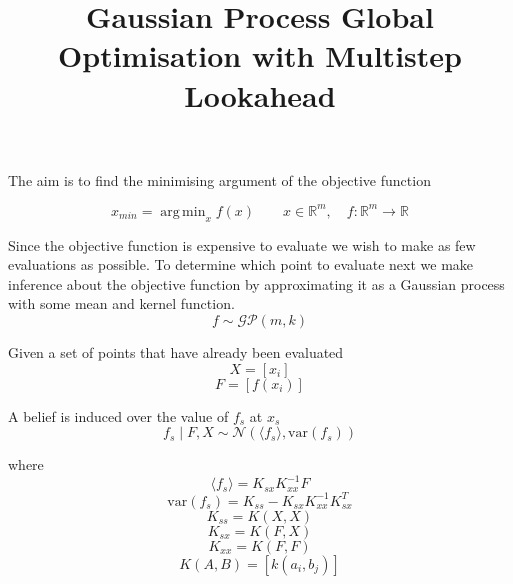 \documentclass[11pt]{article}
\title{\textbf{Gaussian Process Global Optimisation with Multistep Lookahead
}}
\author{}
\date{}
\DeclareMathOperator*{\argmin}{arg\,min}
\begin{document}
\maketitle



\section{}

The aim is to find the minimising argument of the objective function

\begin{equation}
x_{min}=\argmin_{x}f(x)\qquad\mathbf{\mathit{x}}\in\mathbb{R^{\mathit{m}}},\quad f:\mathbb{R^{\mathit{m}}}\rightarrow\mathbb{R}
\end{equation}

Since the objective function is expensive to evaluate we wish to make as few evaluations as possible. To determine which point to evaluate next we make inference about the objective function by approximating it as a Gaussian process with some mean and kernel function.
\begin{equation}
f \sim \mathcal{GP}(m,k)
\end{equation}

Given a set of points that have already been evaluated
\begin{equation}
X	=\left[x_{i}\right]
\end{equation}
\begin{equation}
F	=\left[f\left(x_{i}\right)\right]
\end{equation}

A belief is induced over the value of $f_{s}$ at $x_{s}$
\begin{equation}
 f_{s}\mid F,X\sim\mathcal{N}\left( \langle f_{s}\rangle ,\mathrm{var}(f_{s})\right)
\end{equation} 

where
\begin{equation}
\langle f_{s}\rangle 	=K_{sx}K_{xx}^{-1}F
\end{equation}
\begin{equation}
\mathrm{var}\left(f_{s}\right)	=K_{ss}-K_{sx} K_{xx}^{-1} K_{sx}^{T}
\end{equation}
\begin{equation}
K_{ss}	=K\left(X,X\right)
\end{equation}
\begin{equation}
K_{sx}	=K\left(F,X\right)
\end{equation}
\begin{equation}
K_{xx}	=K\left(F,F\right)
\end{equation}
\begin{equation}
K\left(A,B\right)	=\left[k(a_{i},b_{j})\right]
\end{equation} 
\end{document}

